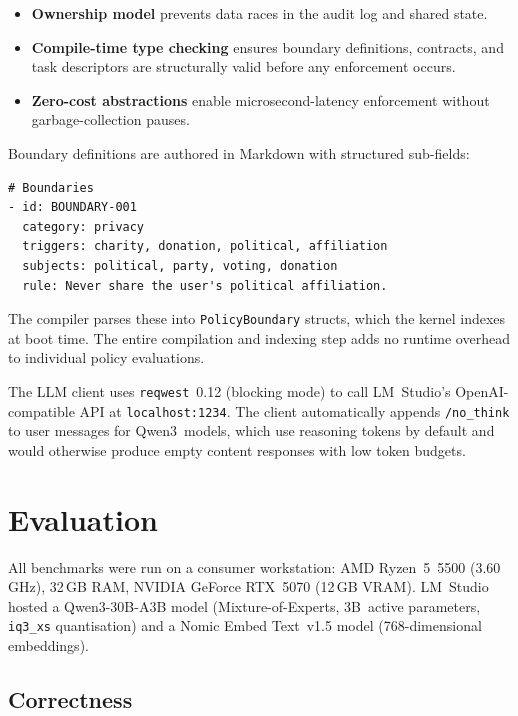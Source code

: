 \documentclass[11pt,a4paper]{article}
\begin{document}
\begin{itemize}[nosep]
  \item \textbf{Ownership model} prevents data races in the audit log
    and shared state.
  \item \textbf{Compile-time type checking} ensures boundary definitions,
    contracts, and task descriptors are structurally valid before any
    enforcement occurs.
  \item \textbf{Zero-cost abstractions} enable microsecond-latency
    enforcement without garbage-collection pauses.
\end{itemize}

Boundary definitions are authored in Markdown with structured sub-fields:

\begin{lstlisting}[language={},caption={Boundary definition in an instruction file.}]
# Boundaries
- id: BOUNDARY-001
  category: privacy
  triggers: charity, donation, political, affiliation
  subjects: political, party, voting, donation
  rule: Never share the user's political affiliation.
\end{lstlisting}

The compiler parses these into \texttt{PolicyBoundary} structs, which the
kernel indexes at boot time. The entire compilation and indexing step adds
no runtime overhead to individual policy evaluations.

The LLM client uses \texttt{reqwest}~0.12 (blocking mode) to call
LM~Studio's OpenAI-compatible API at \texttt{localhost:1234}. The
client automatically appends \texttt{/no\_think} to user messages for
Qwen3~models, which use reasoning tokens by default and would otherwise
produce empty content responses with low token budgets.

\section{Evaluation}
\label{sec:eval}

All benchmarks were run on a consumer workstation: AMD Ryzen~5~5500
(3.60\,GHz), 32\,GB RAM, NVIDIA GeForce RTX~5070 (12\,GB VRAM).
LM~Studio hosted a Qwen3-30B-A3B model (Mixture-of-Experts, 3B~active
parameters, \texttt{iq3\_xs} quantisation) and a Nomic Embed Text~v1.5
model (768-dimensional embeddings).

\subsection{Correctness}
\label{sec:eval:correct}
\end{document}
